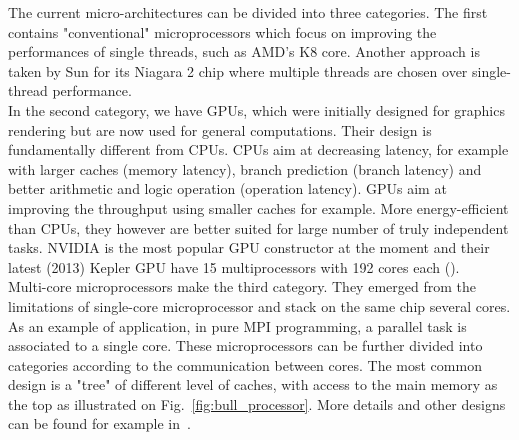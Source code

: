 The current micro-architectures can be divided into three categories. The first
contains "conventional" microprocessors which focus on improving the
performances of single \glspl{thread}, such as AMD's K8 core. Another
approach is taken by Sun for its Niagara 2 chip where multiple threads are
chosen over single-thread performance. \\
In the second category, we have \glspl{GPU}, which were initially designed for
graphics rendering but are now used for general computations. Their design is
fundamentally different from \glspl{CPU}. CPUs aim at decreasing latency, for
example with larger caches (memory latency), branch prediction (branch latency)
and better arithmetic and logic operation (operation latency). GPUs aim at
improving the throughput using smaller caches for example. More energy-efficient
than CPUs, they however are better suited for large number of truly independent
tasks. NVIDIA is the most popular GPU constructor at the moment and their latest
(2013) Kepler GPU have 15 multiprocessors with 192 cores each
(\cite{nvidia2012}).\\
Multi-core microprocessors make the third category. They emerged from the
limitations of single-core microprocessor and stack on the same chip several
cores. As an example of application, in pure MPI programming, a parallel task is
associated to a single core. These microprocessors can be further divided into
categories according to the communication between cores.  The most common design
is a "tree" of different level of caches, with access to the main memory as the
top as illustrated on Fig.~\ref{fig:bull_processor}.  More details and other
designs can be found for example in~\cite{Kogge2008}.

